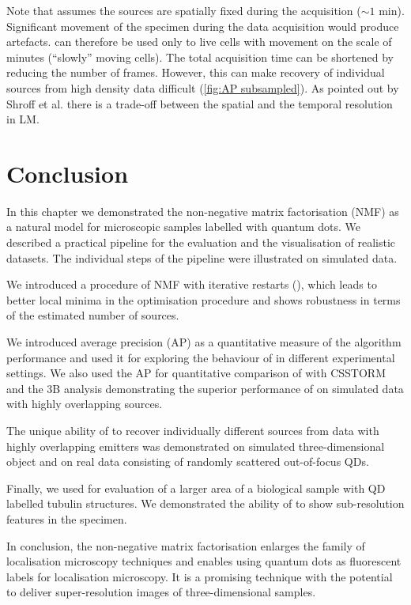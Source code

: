 Note that \inmf{} assumes the sources are spatially fixed during the acquisition ($\sim 1$ min). Significant movement of the specimen during the data acquisition would produce artefacts. \inmf{} can therefore be used only to live cells with movement on the scale of minutes (``slowly'' moving cells). The total acquisition time can be shortened by reducing the number of frames. However, this can make recovery of individual sources from high density data difficult (\autoref{fig:AP subsampled}). As pointed out by Shroff et al. \cite{Shroff2008} there is a trade-off between the spatial and the temporal resolution in LM.
\afterpage{\clearpage} 

\section{Conclusion\label{sec:Conclusion}}

In this chapter we demonstrated the non-negative matrix factorisation (NMF) as a natural model for microscopic samples labelled with quantum dots. We described a practical pipeline for the evaluation and the visualisation of realistic datasets. The individual steps of the pipeline were illustrated on simulated data.

We introduced a procedure of NMF with iterative restarts (\inmf{}), which leads to better local minima in the optimisation procedure and shows robustness in terms of the estimated number of sources. 

We introduced average precision (AP) as a quantitative measure  of the algorithm performance and used it for exploring the behaviour of \inmf{} in different experimental settings. We also used the AP for quantitative comparison of \inmf{} with CSSTORM and the 3B analysis demonstrating the superior performance of \inmf{} on simulated data with highly overlapping sources. 

The unique ability of \inmf{} to recover individually different sources from data with highly overlapping emitters was demonstrated on simulated three-dimensional object and on real data consisting of randomly scattered out-of-focus QDs. 

Finally, we used \inmf{} for evaluation of a larger area of a biological sample with QD labelled tubulin structures. We demonstrated the ability of  \inmf{} to show sub-resolution features in the specimen.

In conclusion, the non-negative matrix factorisation enlarges the family of localisation microscopy techniques and enables using quantum dots as fluorescent labels for localisation microscopy. It is a promising technique with the potential to deliver super-resolution images of three-dimensional samples. 
